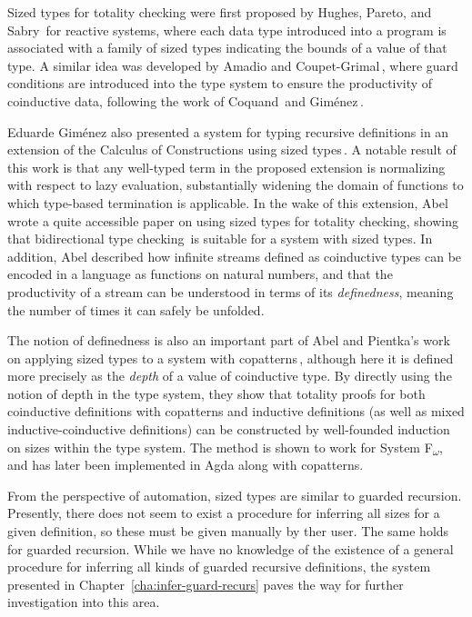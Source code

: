 Sized types for totality checking were first proposed by Hughes, Pareto, and Sabry\,\citep{Hughes96} for reactive systems, where each data type introduced into a program is associated with a family of sized types indicating the bounds of a value of that type. A similar idea was developed by Amadio and Coupet-Grimal\,\citep{Amadio98}, where guard conditions are introduced into the type system to ensure the productivity of coinductive data, following the work of Coquand\,\citep{Coquand94} and Gim\'{e}nez\,\citep{Gimenez95}.

Eduarde Gim\'{e}nez also presented a system for typing recursive definitions in an extension of the Calculus of Constructions using sized types\,\citep{Gimenez98structuralrecursive}. A notable result of this work is that any well-typed term in the proposed extension is normalizing with respect to lazy evaluation, substantially widening the domain of functions to which type-based termination is applicable. In the wake of this extension, Abel\,\citep{Abel99terminationchecking} wrote a quite accessible paper on using sized types for totality checking, showing that bidirectional type checking\,\citep{Pierce00} is suitable for a system with sized types. In addition, Abel described how infinite streams defined as coinductive types can be encoded in a language as functions on natural numbers, and that the productivity of a stream can be understood in terms of its \emph{definedness}, meaning the number of times it can safely be unfolded.

The notion of definedness is also an important part of Abel and Pientka's work
on applying sized types to a system with copatterns\,\citep{Abel13Wellfounded},
although here it is defined more precisely as the \emph{depth} of a value of
coinductive type. By directly using the notion of depth in the type system, they
show that totality proofs for both coinductive definitions with copatterns and
inductive definitions (as well as mixed inductive-coinductive definitions) can
be constructed by well-founded induction on sizes within the type system. The
method is shown to work for System F\textsubscript{$\omega$}, and has later been
implemented in Agda along with copatterns.

From the perspective of automation, sized types are similar to
guarded recursion. Presently, there does not seem to exist a procedure for
inferring all sizes for a given definition, so these must be given manually by
ther user. The same holds for guarded recursion. While we have no knowledge of
the existence of a
general procedure for inferring all kinds of guarded recursive definitions, the
system presented in Chapter~\ref{cha:infer-guard-recurs} paves the way for
further investigation into this area.


